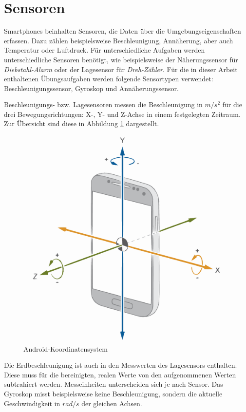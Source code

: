 \documentclass[11pt,a4paper]{report}
\begin{document}
\section{Sensoren}
Smartphones beinhalten Sensoren, die Daten über die Umgebungseigenschaften erfassen.
Dazu zählen beispielsweise Beschleunigung, Annäherung, aber auch Temperatur oder Luftdruck.
Für unterschiedliche Aufgaben werden unterschiedliche Sensoren benötigt, wie beispielsweise der Näherungssensor für \textit{Diebstahl-Alarm} oder der Lagesensor für \textit{Dreh-Zähler}.
Für die in dieser Arbeit enthaltenen Übungsaufgaben werden folgende Sensortypen verwendet: Beschleunigungssensor, Gyroskop und Annäherungssensor.

Beschleunigungs- bzw. Lagesensoren messen die Beschleunigung in $m/s^2$ für die drei Bewegungsrichtungen: X-, Y- und Z-Achse in einem festgelegten Zeitraum.
Zur Übersicht sind diese in Abbildung \ref{fig:and_axes} dargestellt.
\begin{figure}[htbp]
  \centering
  \includegraphics[width=.5\textwidth]{images/android_axes.pdf}
  \caption{Android-Koordinatensystem}
  \label{fig:and_axes}
\end{figure}
Die Erdbeschleunigung ist auch in den Messwerten des Lagesensors enthalten.
Diese muss für die bereinigten, realen Werte von den aufgenommenen Werten subtrahiert werden\cite{accel_g}.
Messeinheiten unterscheiden sich je nach Sensor.
Das Gyroskop misst beispielsweise keine Beschleunigung, sondern die aktuelle Geschwindigkeit in $rad/s$ der gleichen Achsen.
\end{document}

